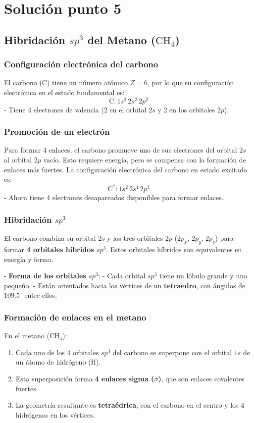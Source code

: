 \documentclass{article}
\begin{document}
\section{Solución punto 5}

\subsection{Hibridación \( sp^3 \) del Metano (\( \text{CH}_4 \))}

\subsubsection{Configuración electrónica del carbono}
El carbono (C) tiene un número atómico \( Z = 6 \), por lo que su configuración electrónica en el estado fundamental es:
\[
\text{C}: 1s^2 \, 2s^2 \, 2p^2
\]
- Tiene 4 electrones de valencia (2 en el orbital \( 2s \) y 2 en los orbitales \( 2p \)).

\subsubsection{Promoción de un electrón}
Para formar 4 enlaces, el carbono promueve uno de sus electrones del orbital \( 2s \) al orbital \( 2p \) vacío. Esto requiere energía, pero se compensa con la formación de enlaces más fuertes. La configuración electrónica del carbono en estado excitado es:
\[
\text{C}^*: 1s^2 \, 2s^1 \, 2p^3
\]
- Ahora tiene 4 electrones desapareados disponibles para formar enlaces.

\subsubsection{Hibridación \( sp^3 \)}
El carbono combina su orbital \( 2s \) y los tres orbitales \( 2p \) (\( 2p_x \), \( 2p_y \), \( 2p_z \)) para formar \textbf{4 orbitales híbridos \( sp^3 \)}. Estos orbitales híbridos son equivalentes en energía y forma.

- \textbf{Forma de los orbitales \( sp^3 \)}:
  - Cada orbital \( sp^3 \) tiene un lóbulo grande y uno pequeño.
  - Están orientados hacia los vértices de un \textbf{tetraedro}, con ángulos de \( 109.5^\circ \) entre ellos.

\subsubsection{Formación de enlaces en el metano}
En el metano (\( \text{CH}_4 \)):
\begin{enumerate}
    \item Cada uno de los 4 orbitales \( sp^3 \) del carbono se superpone con el orbital \( 1s \) de un átomo de hidrógeno (H).
    \item Esta superposición forma \textbf{4 enlaces sigma (\( \sigma \))}, que son enlaces covalentes fuertes.
    \item La geometría resultante es \textbf{tetraédrica}, con el carbono en el centro y los 4 hidrógenos en los vértices.
\end{enumerate}
\end{document}
